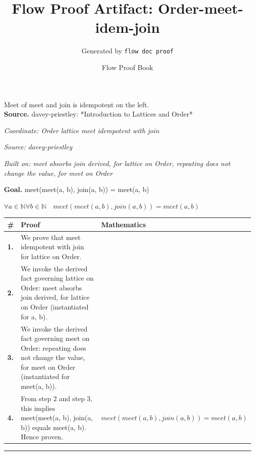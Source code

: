 \documentclass[11pt]{article}
\title{Flow Proof Artifact: Order-meet-idem-join}
\author{Generated by \texttt{flow doc proof}}
\date{Flow Proof Book}
\theoremstyle{definition}
\begin{document}
\maketitle
Meet of meet and join is idempotent on the left.\\[0.5em]
\textbf{Source.} davey-priestley: *Introduction to Lattices and Order*\\[0.5em]
\bigskip
{}\par
\smallskip\noindent\textit{Coordinate: Order \cdot lattice \cdot meet idempotent with join}\par
\smallskip\noindent\textit{Source: davey-priestley}\par
\smallskip\noindent\textit{Built on: meet absorbs join derived, for lattice on Order, repeating does not change the value, for meet on Order}\par
\medskip
\noindent\textbf{Goal.} meet(meet(a, b), join(a, b)) = meet(a, b)\par
\noindent$\displaystyle \forall a \in \mathbb{N} \forall b \in \mathbb{N}\quad meet(meet(a, b), join(a, b)) = meet(a, b)$\par
\medskip
\noindent
\begin{tabular}{@{} >{\raggedright\arraybackslash}p{} >{\raggedright\arraybackslash}p{} >{\raggedleft\arraybackslash}p{} @{}}
\textbf{\#} & \textbf{Proof} & \textbf{Mathematics} \\
\midrule
\textbf{1.} & We prove that meet idempotent with join for lattice on Order. & \\[0.45em]
\textbf{2.} & We invoke the derived fact governing lattice on Order: meet absorbs join derived, for lattice on Order (instantiated for a, b). & \\[0.45em]
\textbf{3.} & We invoke the derived fact governing meet on Order: repeating does not change the value, for meet on Order (instantiated for meet(a, b)). & \\[0.45em]
\textbf{4.} & From step 2 and step 3, this implies meet(meet(a, b), join(a, b)) equals meet(a, b). Hence proven. & $\displaystyle meet(meet(a, b), join(a, b)) = meet(a, b)$ \\[0.45em]
\bottomrule
\end{tabular}
\label{thm:Order-lattice-meet_idempotent_with_join}
\par\medskip\hrule
\end{document}
